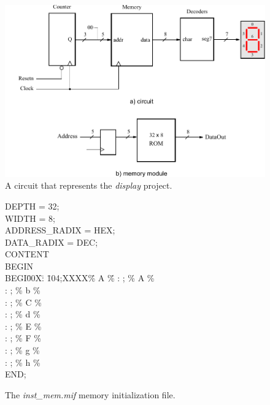{\begin{figure}[t]
	\begin{center}
		\includegraphics[scale = 1.0]{figures/figdisplay.pdf}
	\end{center}
          \caption{A circuit that represents the {\it display} project.}
	\label{fig:memory}
\end{figure}

\begin{figure}[bh!]
\begin{center}
\begin{minipage}[t]{12.5 cm}
\begin{tabbing}
DEPTH = 32;\\
WIDTH = 8;\\
ADDRESS\_RADIX = HEX;\\
DATA\_RADIX = DEC;\\
CONTENT\\
BEGIN\\
BEGI\=00X\=: \=104;XXXX\=\% A \=\% \kill
{} \>: ;    \>\% A \>\%\\
 \>: ;    \>\% b \>\%\\
 \>: ;    \>\% C \>\%\\
 \>: ;   \>\% d \>\%\\
 \>: ;    \>\% E \>\%\\
 \>: ;    \>\% F \>\%\\
 \>: ;   \>\% g \>\%\\
 \>: ;   \>\% h \>\%\\
END;
\end{tabbing}
\end{minipage}
\end{center}
    \caption{The {\it inst\_mem.mif} memory initialization file.}
\label{fig:mif}
\end{figure}

}
